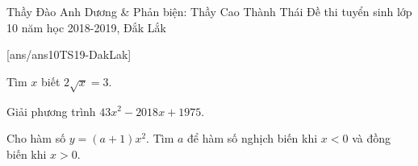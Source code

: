 \begin{name}
{Thầy Đào Anh Dương \& Phản biện: Thầy Cao Thành Thái}
{Đề thi tuyển sinh lớp 10 năm học 2018-2019, Đắk Lắk }
\end{name}
\setcounter{ex}{0}
[ans/ans10TS19-DakLak]

\begin{ex}%
Tìm $x$ biết $2\sqrt{x}=3$.
\end{ex}

\begin{ex}%
 Giải phương trình $43x^2-2018x+1975$.
\end{ex}

\begin{ex}%
Cho hàm số $y=(a+1)x^2$. Tìm $a$ để hàm số nghịch biến khi $x<0$ và đồng biến khi $x>0$.
\end{ex}

